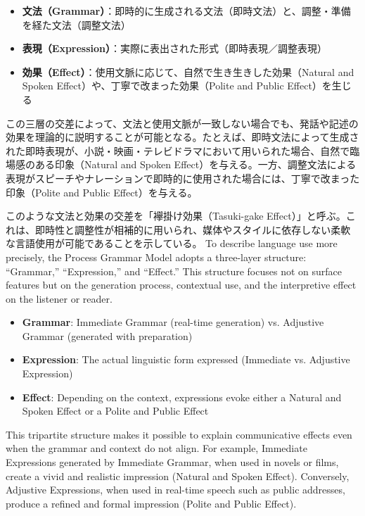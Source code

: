 \begin{itemize}
  \item \textbf{文法（Grammar）}：即時的に生成される文法（即時文法）と、調整・準備を経た文法（調整文法）
  \item \textbf{表現（Expression）}：実際に表出された形式（即時表現／調整表現）
  \item \textbf{効果（Effect）}：使用文脈に応じて、自然で生き生きした効果（Natural and Spoken Effect）や、丁寧で改まった効果（Polite and Public Effect）を生じる
\end{itemize}

この三層の交差によって、文法と使用文脈が一致しない場合でも、発話や記述の効果を理論的に説明することが可能となる。たとえば、即時文法によって生成された即時表現が、小説・映画・テレビドラマにおいて用いられた場合、自然で臨場感のある印象（Natural and Spoken Effect）を与える。一方、調整文法による表現がスピーチやナレーションで即時的に使用された場合には、丁寧で改まった印象（Polite and Public Effect）を与える。

このような文法と効果の交差を「襷掛け効果（Tasuki-gake Effect）」と呼ぶ。これは、即時性と調整性が相補的に用いられ、媒体やスタイルに依存しない柔軟な言語使用が可能であることを示している。
\else
To describe language use more precisely, the Process Grammar Model adopts a three-layer structure: ``Grammar,'' ``Expression,'' and ``Effect.'' This structure focuses not on surface features but on the generation process, contextual use, and the interpretive effect on the listener or reader.

\begin{itemize}
  \item \textbf{Grammar}: Immediate Grammar (real-time generation) vs. Adjustive Grammar (generated with preparation)
  \item \textbf{Expression}: The actual linguistic form expressed (Immediate vs. Adjustive Expression)
  \item \textbf{Effect}: Depending on the context, expressions evoke either a Natural and Spoken Effect or a Polite and Public Effect
\end{itemize}

This tripartite structure makes it possible to explain communicative effects even when the grammar and context do not align. For example, Immediate Expressions generated by Immediate Grammar, when used in novels or films, create a vivid and realistic impression (Natural and Spoken Effect). Conversely, Adjustive Expressions, when used in real-time speech such as public addresses, produce a refined and formal impression (Polite and Public Effect).

